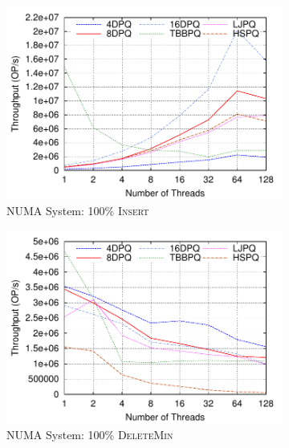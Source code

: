 \documentclass[10pt,journal,letter,compsoc]{IEEEtran}
\begin{document}
\begin{figure}[t]
    \begin{subfigure}{0.33\textwidth}
        \centering
        \includegraphics[width=1\columnwidth]{./data/amd100insertion.pdf}
        \caption{NUMA System: 100\% \textsc{Insert}}
        \label{fig:100ins}
    \end{subfigure}
    \hfill
    \begin{subfigure}{0.33\textwidth}
        \centering
        \includegraphics[width=1\columnwidth]{./data/amd0insertion.pdf}
        \caption{NUMA System: 100\% \textsc{DeleteMin}}
        \label{fig:0ins}
    \end{subfigure}
    \hfill
    \begin{subfigure}{0.33\textwidth}
        \centering

\end{subfigure}
\end{figure}
\end{document}
